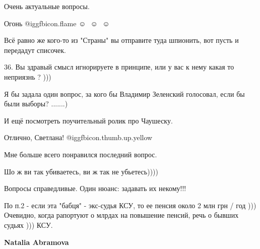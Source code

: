 \begin{itemize}
Очень актуальные вопросы.

Огонь  @igg{fbicon.flame}   ☺ ️  ☺ ️  ☺ ️ 

Всё равно же кого-то из "Страны" вы отправите туда шпионить, вот пусть и передадут списочек.

36. Вы здравый смысл игнорируете в принципе, или у вас к нему какая то неприязнь ? )))

Я бы задала один вопрос, за кого бы Владимир Зеленский голосовал, если бы были выборы? .......)

И ещё посмотреть поучительный ролик про Чаушеску.

Отлично, Светлана! @igg{fbicon.thumb.up.yellow} 

Мне больше всего понравился последний вопрос.

Шо ж ви так убиваетесь, ви ж так не убьетесь))))

Вопросы справедливые.
Один нюанс: задавать их некому!!!


По п.2 - если эта "бабця" - экс-судья КСУ, то ее пенсия около 2 млн грн / год
))) Очевидно, когда рапортуют о млрдах на повышение пенсий, речь о бывших
судьях ))) КСУ.

\textbf{Natalia Abramova}


\end{itemize}
